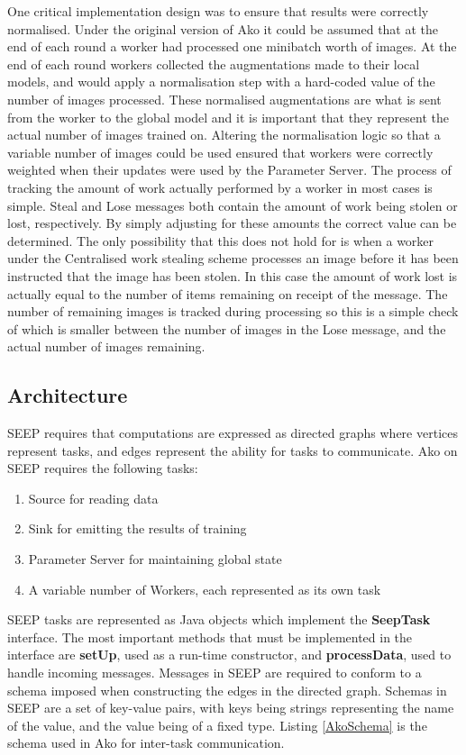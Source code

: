 \documentclass[12pt]{article}
\begin{document}
One critical implementation design was to ensure that results were correctly normalised. Under the original version of Ako it could be assumed that at the end of each round a worker had processed one minibatch worth of images. At the end of each round workers collected the augmentations made to their local models, and would apply a normalisation step with a hard-coded value of the number of images processed. These normalised augmentations are what is sent from the worker to the global model and it is important that they represent the actual number of images trained on. Altering the normalisation logic so that a variable number of images could be used ensured that workers were correctly weighted when their updates were used by the Parameter Server. The process of tracking the amount of work actually performed by a worker in most cases is simple. Steal and Lose messages both contain the amount of work being stolen or lost, respectively. By simply adjusting for these amounts the correct value can be determined. The only possibility that this does not hold for is when a worker under the Centralised work stealing scheme processes an image before it has been instructed that the image has been stolen. In this case the amount of work lost is actually equal to the number of items remaining on receipt of the message. The number of remaining images is tracked during processing so this is a simple check of which is smaller between the number of images in the Lose message, and the actual number of images remaining.

\subsection{Architecture}
SEEP requires that computations are expressed as directed graphs where vertices represent tasks, and edges represent the ability for tasks to communicate. Ako on SEEP requires the following tasks:

\begin{enumerate}
\item Source for reading data
\item Sink for emitting the results of training
\item Parameter Server for maintaining global state
\item A variable number of Workers, each represented as its own task
\end{enumerate}

SEEP tasks are represented as Java objects which implement the \textbf{SeepTask} interface. The most important methods that must be implemented in the interface are \textbf{setUp}, used as a run-time constructor, and \textbf{processData}, used to handle incoming messages. Messages in SEEP are required to conform to a schema imposed when constructing the edges in the directed graph. Schemas in SEEP are a set of key-value pairs, with keys being strings representing the name of the value, and the value being of a fixed type. Listing \ref{AkoSchema} is the schema used in Ako for inter-task communication.
\end{document}
